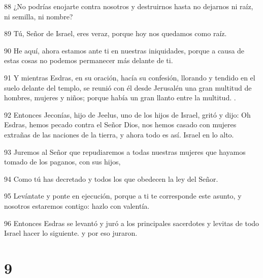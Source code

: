 \par 88 ¿No podrías enojarte contra nosotros y destruirnos hasta no dejarnos ni raíz, ni semilla, ni nombre?
\par 89 Tú, Señor de Israel, eres veraz, porque hoy nos quedamos como raíz.
\par 90 He aquí, ahora estamos ante ti en nuestras iniquidades, porque a causa de estas cosas no podemos permanecer más delante de ti.
\par 91 Y mientras Esdras, en su oración, hacía su confesión, llorando y tendido en el suelo delante del templo, se reunió con él desde Jerusalén una gran multitud de hombres, mujeres y niños; porque había un gran llanto entre la multitud. .
\par 92 Entonces Jeconías, hijo de Jeelus, uno de los hijos de Israel, gritó y dijo: Oh Esdras, hemos pecado contra el Señor Dios, nos hemos casado con mujeres extrañas de las naciones de la tierra, y ahora todo es así. Israel en lo alto.
\par 93 Juremos al Señor que repudiaremos a todas nuestras mujeres que hayamos tomado de los paganos, con sus hijos,
\par 94 Como tú has decretado y todos los que obedecen la ley del Señor.
\par 95 Levántate y ponte en ejecución, porque a ti te corresponde este asunto, y nosotros estaremos contigo: hazlo con valentía.
\par 96 Entonces Esdras se levantó y juró a los principales sacerdotes y levitas de todo Israel hacer lo siguiente. y por eso juraron.

\chapter{9}

